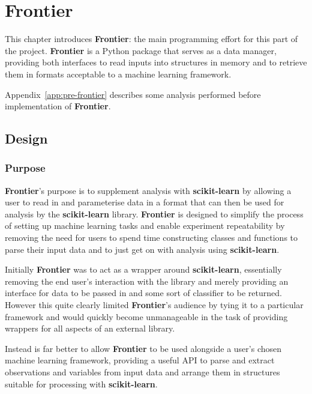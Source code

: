 \chapter{Frontier}
\ifpdf
    \graphicspath{{Chapter3/Figs/Raster/}{Chapter3/Figs/PDF/}{Chapter3/Figs/}}
\else
    \graphicspath{{Chapter3/Figs/Vector/}{Chapter3/Figs/}}
\fi


This chapter introduces \textbf{Frontier}: the main programming effort for this
part of the project. \textbf{Frontier} is a Python package that serves as a data manager,
providing both interfaces to read inputs into structures in memory and to
retrieve them in formats acceptable to a machine learning framework.

Appendix~\ref{app:pre-frontier} describes some analysis performed before
implementation of \textbf{Frontier}.

\section{Design}
\subsection{Purpose}

\textbf{Frontier}'s purpose is to supplement analysis with \textbf{scikit-learn} by
allowing a user to read in and parameterise data in a format that can then be
used for analysis by the \textbf{scikit-learn} library.  \textbf{Frontier} is designed
to simplify the process of setting up machine learning tasks and enable
experiment repeatability by removing the need for users to spend time
constructing classes and functions to parse their input data and to just get on
with analysis using \textbf{scikit-learn}.

Initially \textbf{Frontier} was to act as a wrapper around \textbf{scikit-learn},
essentially removing the end user's interaction with the library and merely
providing an interface for data to be passed in and some sort of classifier to
be returned. However this quite clearly limited \textbf{Frontier}'s audience by tying it
to a particular framework and would quickly become unmanageable in the task of
providing wrappers for all aspects of an external library.

Instead is far better to allow \textbf{Frontier} to be used alongside a user's chosen
machine learning framework, providing a useful API to parse and extract
observations and variables from input data and arrange them in structures
suitable for processing with \textbf{scikit-learn}.

